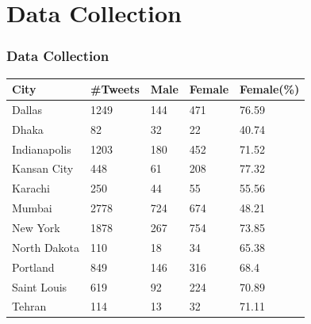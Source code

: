 \documentclass{beamer}
\begin{document}
	\section{Data Collection}
	\begin{frame}
		\frametitle{Data Collection}
		\centering
		\begin{tabular}{|l|l|l|l|l|}
			\hline
			\rowcolor{LightCyan}
			\textbf{City} & \textbf{\#Tweets} & \textbf{Male} & \textbf{Female} & \textbf{Female(\%)}   \\
			
			\hline
			Dallas & 1249 & 144 & 471 & 76.59 \\
			\hline
			Dhaka & 82 & 32 &  22 & 40.74  \\
			\hline
			Indianapolis & 1203 & 180 & 452 & 71.52  \\
			\hline
			Kansan City & 448 & 61 & 208 & 77.32  \\
			\hline
			Karachi & 250 & 44 & 55 & 55.56  \\
			\hline
			Mumbai & 2778 & 724 & 674 & 48.21  \\
			\hline
			New York & 1878 & 267 & 754 & 73.85  \\
			\hline
			North Dakota & 110 & 18 & 34 & 65.38  \\
			\hline
			Portland & 849 & 146 & 316 & 68.4  \\
			\hline
			Saint Louis & 619 & 92 & 224 & 70.89  \\
			\hline
			Tehran & 114 & 13 & 32 & 71.11  \\
			\hline
			
			
		\end{tabular}
		
	\end{frame}
\end{document}
